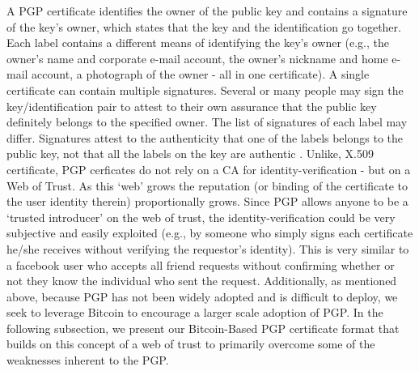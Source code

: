 \documentclass{llncs}
\begin{document}
A PGP certificate identifies the owner of the public key and contains a signature of the key's owner, which states that the key and the identification go together. Each label contains a different means of identifying the key's owner (e.g., the owner's name and corporate e-mail account, the owner's nickname and home e-mail account, a photograph of the owner - all in one certificate). A single certificate can contain multiple signatures. Several or many people may sign the key/identification pair to attest to their own assurance that the public key definitely belongs to the specified owner. The list of signatures of each label may differ. Signatures attest to the authenticity that one of the labels belongs to the public key, not that all the labels on the key are authentic \cite{pki}. Unlike, X.509 certificate, PGP cerficates do not rely on a CA for identity-verification - but on a Web of Trust.  As this `web' grows the reputation (or binding of the certificate to the user identity therein) proportionally grows.  Since PGP allows anyone to be a `trusted introducer' on the web of trust, the identity-verification could be very subjective and easily exploited (e.g., by someone who simply signs each certificate he/she receives without verifying the requestor's identity).  This is very similar to a facebook user who accepts all friend requests without confirming whether or not they know the individual who sent the request.  Additionally, as mentioned above, because PGP has not been widely adopted and is difficult to deploy, we seek to leverage Bitcoin to encourage a larger scale adoption of PGP.  In the following subsection, we present our Bitcoin-Based PGP certificate format that builds on this concept of a web of trust to primarily overcome some of the weaknesses inherent to the PGP.
\end{document}
